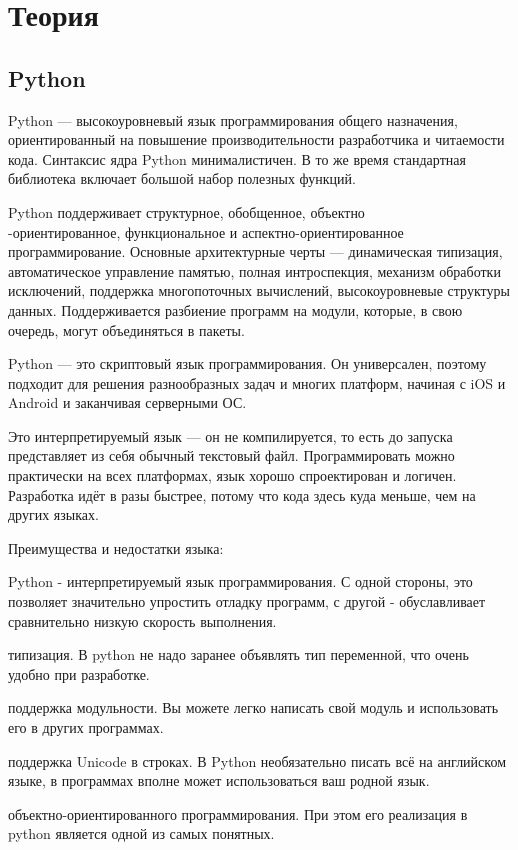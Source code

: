 \documentclass[11pt,a4paper]{report}
\begin{document}
\tableofcontents
\newpage
\section{Теория}
\subsection{Python}
Python — высокоуровневый язык программирования общего назначения, ориентированный на повышение производительности разработчика и читаемости кода. Синтаксис ядра Python минималистичен. В то же время стандартная библиотека включает большой набор полезных функций.

Python поддерживает структурное, обобщенное, объектно\\-ориентированное, функциональное и аспектно-ориентированное программирование. Основные архитектурные черты — динамическая типизация, автоматическое управление памятью, полная интроспекция, механизм обработки исключений, поддержка многопоточных вычислений, высокоуровневые структуры данных. Поддерживается разбиение программ на модули, которые, в свою очередь, могут объединяться в пакеты.

Python — это скриптовый язык программирования. Он универсален, поэтому подходит для решения разнообразных задач и многих платформ, начиная с iOS и Android и заканчивая серверными ОС.

Это интерпретируемый язык — он не компилируется, то есть до запуска представляет из себя обычный текстовый файл. Программировать можно практически на всех платформах, язык хорошо спроектирован и логичен.
Разработка идёт в разы быстрее, потому что кода здесь куда меньше, чем на других языках.

Преимущества и недостатки языка:

\noindent Python - интерпретируемый язык программирования. С одной стороны, это позволяет значительно упростить отладку программ, с другой - обуславливает сравнительно низкую скорость выполнения.

 типизация. В python не надо заранее объявлять тип переменной, что очень удобно при разработке.

 поддержка модульности. Вы можете легко написать свой модуль и использовать его в других программах.

 поддержка Unicode в строках. В Python необязательно писать всё на английском языке, в программах вполне может использоваться ваш родной язык.

 объектно-ориентированного программирования. При этом его реализация в python является одной из самых понятных.
\end{document}
